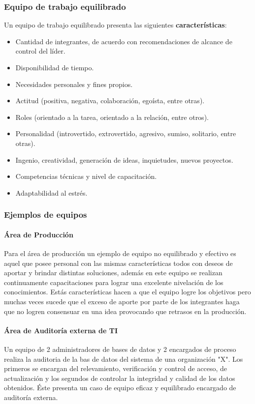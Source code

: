 \subsubsection{Equipo de trabajo equilibrado}

Un equipo de trabajo equilibrado presenta las siguientes \textbf{características}:

\begin{itemize}
    \item Cantidad de integrantes, de acuerdo con recomendaciones de alcance de control del líder.
    \item Disponibilidad de tiempo.
    \item Necesidades personales y fines propios.
    \item Actitud (positiva, negativa, colaboración, egoísta, entre otras).
    \item Roles (orientado a la tarea, orientado a la relación, entre otros).
    \item Personalidad (introvertido, extrovertido, agresivo, sumiso, solitario, entre otras).
    \item Ingenio, creatividad, generación de ideas, inquietudes, nuevos proyectos.
    \item Competencias técnicas y nivel de capacitación.
    \item Adaptabilidad al estrés.
\end{itemize}

\subsubsection{Ejemplos de equipos}

\paragraph{Área de Producción}
Para el área de producción un ejemplo de equipo no equilibrado y efectivo es aquel que posee  personal con las mismas características todos con deseos de aportar y brindar distintas soluciones, además en este equipo se realizan continuamente capacitaciones para lograr una excelente nivelación de los conocimientos.
Estás características hacen a que el equipo logre los objetivos pero muchas veces sucede que el exceso de aporte por parte de los integrantes haga que no logren consensuar en una idea provocando que retrasos en la producción.


\paragraph{Área de Auditoría externa de TI}
Un equipo de 2 administradores de bases de datos y 2 encargados de proceso realiza la auditoria de la bas de datos del sistema de una organización "X". Los primeros se encargan del relevamiento, verificación y control de acceso, de actualización y los segundos de controlar la integridad y calidad de los datos obtenidos. Éste presenta un caso de equipo eficaz y equilibrado encargado de auditoría externa.


